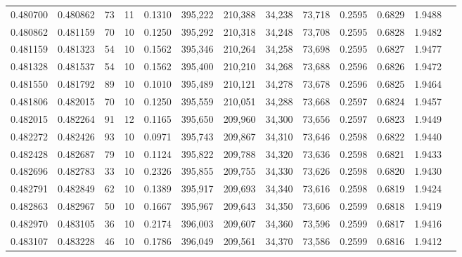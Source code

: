 \begin{tabular}{rrrrrrrrrrrrr}
0.480700 & 0.480862 &    73 &  11 &                                     0.1310 & 395,222 & 210,388 &  34,238 &  73,718 & 0.2595 & 0.6829 & 1.9488 \\
0.480862 & 0.481159 &    70 &  10 &                                     0.1250 & 395,292 & 210,318 &  34,248 &  73,708 & 0.2595 & 0.6828 & 1.9482 \\
0.481159 & 0.481323 &    54 &  10 &                                     0.1562 & 395,346 & 210,264 &  34,258 &  73,698 & 0.2595 & 0.6827 & 1.9477 \\
0.481328 & 0.481537 &    54 &  10 &                                     0.1562 & 395,400 & 210,210 &  34,268 &  73,688 & 0.2596 & 0.6826 & 1.9472 \\
0.481550 & 0.481792 &    89 &  10 &                                     0.1010 & 395,489 & 210,121 &  34,278 &  73,678 & 0.2596 & 0.6825 & 1.9464 \\
0.481806 & 0.482015 &    70 &  10 &                                     0.1250 & 395,559 & 210,051 &  34,288 &  73,668 & 0.2597 & 0.6824 & 1.9457 \\
0.482015 & 0.482264 &    91 &  12 &                                     0.1165 & 395,650 & 209,960 &  34,300 &  73,656 & 0.2597 & 0.6823 & 1.9449 \\
0.482272 & 0.482426 &    93 &  10 &                                     0.0971 & 395,743 & 209,867 &  34,310 &  73,646 & 0.2598 & 0.6822 & 1.9440 \\
0.482428 & 0.482687 &    79 &  10 &                                     0.1124 & 395,822 & 209,788 &  34,320 &  73,636 & 0.2598 & 0.6821 & 1.9433 \\
0.482696 & 0.482783 &    33 &  10 &                                     0.2326 & 395,855 & 209,755 &  34,330 &  73,626 & 0.2598 & 0.6820 & 1.9430 \\
0.482791 & 0.482849 &    62 &  10 &                                     0.1389 & 395,917 & 209,693 &  34,340 &  73,616 & 0.2598 & 0.6819 & 1.9424 \\
0.482863 & 0.482967 &    50 &  10 &                                     0.1667 & 395,967 & 209,643 &  34,350 &  73,606 & 0.2599 & 0.6818 & 1.9419 \\
0.482970 & 0.483105 &    36 &  10 &                                     0.2174 & 396,003 & 209,607 &  34,360 &  73,596 & 0.2599 & 0.6817 & 1.9416 \\
0.483107 & 0.483228 &    46 &  10 &                                     0.1786 & 396,049 & 209,561 &  34,370 &  73,586 & 0.2599 & 0.6816 & 1.9412 \\

\end{tabular}
